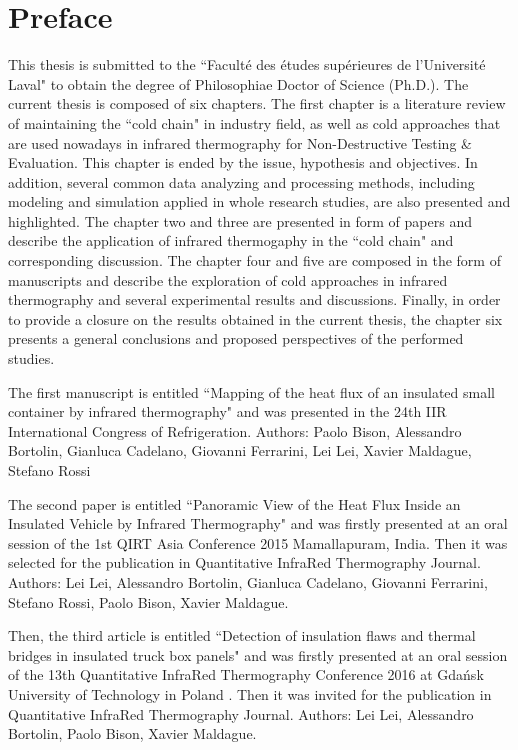 \chapter*{Preface}         %

This thesis is submitted to the ``Faculté des études supérieures de l'Université Laval" to obtain the degree of Philosophiae Doctor of Science (Ph.D.). The current thesis is composed of six chapters. The first chapter is a literature review of maintaining the ``cold chain" in industry field, as well as cold approaches that are used nowadays in infrared thermography for Non-Destructive Testing \& Evaluation. This chapter is ended by the issue, hypothesis and objectives. In addition, several common data analyzing and processing methods, including modeling and simulation applied in whole research studies, are also presented and highlighted. The chapter two and three are presented in form of papers and describe the application of infrared thermogaphy in the ``cold chain" and corresponding discussion. The chapter four and five are composed in the form of manuscripts and describe the exploration of cold approaches in infrared thermography and several experimental results and discussions. Finally, in order to provide a closure on the results obtained in the current thesis, the chapter six presents a general conclusions and proposed perspectives of the performed studies.

The first manuscript is entitled ``Mapping of the heat flux of an insulated small container by infrared thermography" and was presented in the 24th IIR International Congress of Refrigeration. Authors: Paolo Bison, Alessandro Bortolin, Gianluca Cadelano, Giovanni Ferrarini, Lei Lei, Xavier Maldague, Stefano Rossi

The second paper is entitled ``Panoramic View of the Heat Flux Inside an Insulated Vehicle by Infrared Thermography" and was firstly presented at an oral session of the 1st QIRT Asia Conference 2015 Mamallapuram, India. Then it was selected for the publication in Quantitative InfraRed Thermography Journal. Authors: Lei Lei, Alessandro Bortolin, Gianluca Cadelano, Giovanni Ferrarini, Stefano Rossi, Paolo Bison, Xavier Maldague. 

Then, the third article is entitled ``Detection of insulation flaws and thermal bridges in insulated truck box panels" and was firstly presented at an oral session of the 13th Quantitative InfraRed Thermography Conference 2016 at Gdańsk University of Technology in Poland . Then it was invited for the publication in Quantitative InfraRed Thermography Journal. Authors: Lei Lei, Alessandro Bortolin, Paolo Bison, Xavier Maldague.

